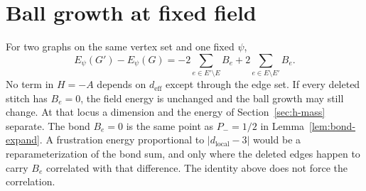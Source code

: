 \section{Ball growth at fixed field}
\label{sec:h-frust}

For two graphs on the same vertex set and one fixed \(\psi\),
\[
E_\psi(G')-E_\psi(G)
=-2\sum_{e\in E'\setminus E}B_e
+2\sum_{e\in E\setminus E'}B_e.
\]
No term in \(H=-A\) depends on \(d_{\mathrm{eff}}\) except through the edge set.
If every deleted stitch has \(B_e=0\), the field energy is unchanged and the
ball growth may still change.
At that locus a dimension and the energy of Section~\ref{sec:h-mass} separate.
The bond \(B_e=0\) is the same point as \(P_-=1/2\) in Lemma~\ref{lem:bond-expand}.
A frustration energy proportional to \(|d_{\mathrm{local}}-3|\) would be a
reparameterization of the bond sum, and only where the deleted edges happen
to carry \(B_e\) correlated with that difference.
The identity above does not force the correlation.
